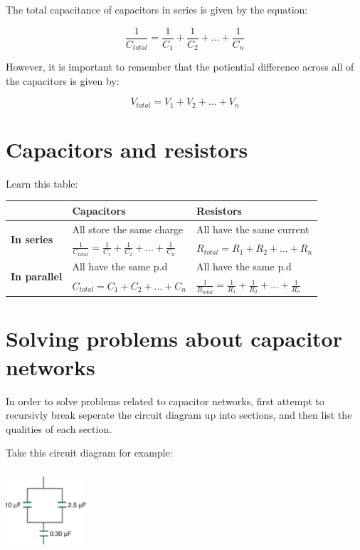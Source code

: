 \documentclass{article}
\begin{document}
The total capacitance of capacitors in series is given by the equation:

\[
	\frac{1}{C_{total}} = \frac{1}{C_1} + \frac{1}{C_2} + ... + \frac{1}{C_n}
\]

However, it is important to remember that the potiential difference across all
of the capacitors is given by:

\[
	V_{total} = V_1 + V_2 + ... + V_n
\]

\section*{Capacitors and resistors}

Learn this table:

\def\arraystretch{1.5}
\begin{tabular}{|l|l|l|}
	\hline
	& {\bf Capacitors} & {\bf Resistors} \\ \hline

	\multirow{2}{*}{\bf In series} & All store the same charge & All have the 
	same current \\
	& $\frac{1}{C_{total}} = \frac{1}{C_1} + \frac{1}{C_2} + ... + 
	\frac{1}{C_n}$ & $R_{total} = R_1 + R_2 + ... + R_n$\\ \hline

	\multirow{2}{*}{\bf In parallel} & All have the same p.d & All have the same
	p.d \\
	& $C_{total} = C_1 + C_2 + ... + C_n$ & 
	$\frac{1}{R_{total}} = \frac{1}{R_1} + \frac{1}{R_2} + ... +
	\frac{1}{R_n}$\\ \hline

\end{tabular}

\section*{Solving problems about capacitor networks}

In order to solve problems related to capacitor networks, first attempt to
recursivly break seperate the circuit diagram up into sections, and then list
the qualities of each section.

\newpage

Take this circuit diagram for example:

\begin{center}
	\includegraphics[height=3cm, width=3cm]{diagram}
\end{center}
\end{document}
